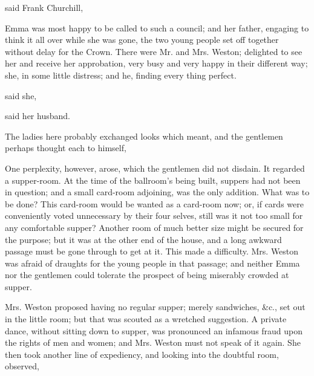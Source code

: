  said Frank Churchill, 

Emma was most happy to be called to such a council; and her father, engaging to think it all over while she was gone, the two young people set off together without delay for the Crown. There were Mr. and Mrs. Weston; delighted to see her and receive her approbation, very busy and very happy in their different way; she, in some little distress; and he, finding every thing perfect.

 said she, 

 said her husband. 

The ladies here probably exchanged looks which meant,  and the gentlemen perhaps thought each to himself, 

One perplexity, however, arose, which the gentlemen did not disdain. It regarded a supper-room. At the time of the ballroom's being built, suppers had not been in question; and a small card-room adjoining, was the only addition. What was to be done? This card-room would be wanted as a card-room now; or, if cards were conveniently voted unnecessary by their four selves, still was it not too small for any comfortable supper? Another room of much better size might be secured for the purpose; but it was at the other end of the house, and a long awkward passage must be gone through to get at it. This made a difficulty. Mrs. Weston was afraid of draughts for the young people in that passage; and neither Emma nor the gentlemen could tolerate the prospect of being miserably crowded at supper.

Mrs. Weston proposed having no regular supper; merely sandwiches, &c., set out in the little room; but that was scouted as a wretched suggestion. A private dance, without sitting down to supper, was pronounced an infamous fraud upon the rights of men and women; and Mrs. Weston must not speak of it again. She then took another line of expediency, and looking into the doubtful room, observed,

